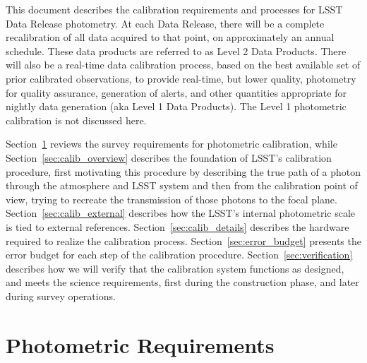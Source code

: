 \documentclass[12pt,preprint]{aastex}
\begin{document}
This document describes the calibration requirements and processes for
LSST Data Release photometry. At each Data Release, there will be a
complete recalibration of all data acquired to that point, on
approximately an annual schedule.  These data products are referred to
as Level 2 Data Products.  There will
also be a real-time data calibration process, based on the best
available set of prior calibrated observations, to provide real-time, but lower quality,
                                                                                                 photometry for quality assurance,
generation of alerts, and other quantities appropriate for nightly
data generation (aka Level 1 Data Products).  The Level 1 photometric
calibration is not discussed here.

Section~\ref{sec:photoreq} reviews the survey requirements for
photometric calibration, while Section~\ref{sec:calib_overview}
describes the foundation of LSST's calibration procedure, first
motivating this procedure by describing the true path of a photon
through the atmosphere and LSST system and then from the calibration
point of view, trying to recreate the transmission of those photons to
the focal plane.  
Section~\ref{sec:calib_external} describes how the LSST's internal
photometric scale is tied to external references.
Section~\ref{sec:calib_details} describes the hardware required
to realize the calibration process.
Section~\ref{sec:error_budget} presents the error budget for each step of the 
calibration procedure.
Section~\ref{sec:verification} describes how we will verify that the
calibration system functions as designed, and meets the science
requirements, first during the construction phase, and later during
survey operations.


\section{Photometric Requirements}
\label{sec:photoreq}
\end{document}
